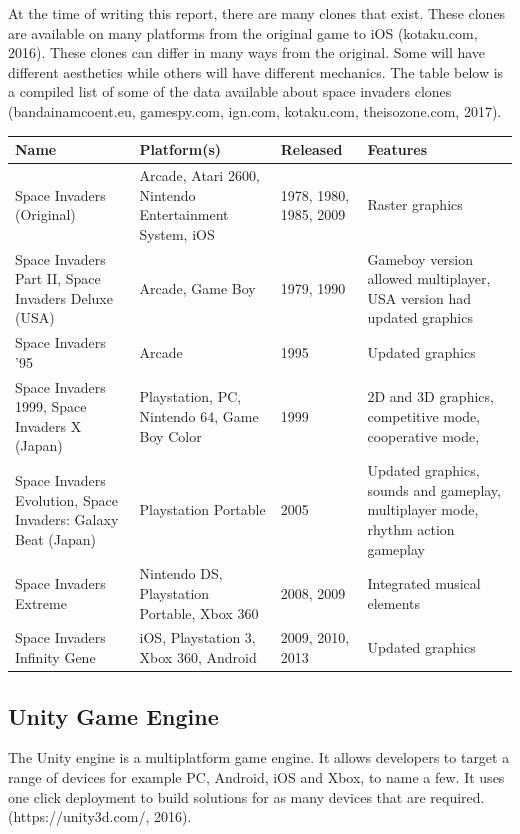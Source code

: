 \documentclass[12pt]{article}
\begin{document}
At the time of writing this report, there are many clones that exist. These clones are available on many platforms from the original game to iOS (kotaku.com, 2016). These clones can differ in many ways from the original. Some will have different aesthetics while others will have different mechanics. The table below is a compiled list of some of the data available about space invaders clones (bandainamcoent.eu, gamespy.com, ign.com, kotaku.com, theisozone.com, 2017).

\begin{center}
    \begin{tabular}{ | p{2.25cm} | p{2.5cm} | p{4.5cm} | p{4cm} |} \hline
    Name & Platform(s) & Released & Features \\ \hline
    Space Invaders (Original) & Arcade, Atari 2600, Nintendo Entertainment System, iOS & 1978, 1980, 1985, 2009 & Raster graphics \\ \hline
    
    Space Invaders Part II, Space Invaders Deluxe (USA) & Arcade, Game Boy & 1979, 1990 & Gameboy version allowed multiplayer, USA version had updated graphics\\ \hline
    
    Space Invaders '95 & Arcade & 1995 & Updated graphics  \\ \hline
    
	Space Invaders 1999, Space Invaders X (Japan) & Playstation, PC, Nintendo 64, Game Boy Color & 1999 & 2D and 3D graphics, competitive mode, cooperative mode,   \\ \hline 
	
	Space Invaders Evolution, Space Invaders: Galaxy Beat (Japan) & Playstation Portable & 2005 & Updated graphics, sounds and gameplay, multiplayer mode, rhythm action gameplay \\ \hline
	
	Space Invaders Extreme & Nintendo DS, Playstation Portable, Xbox 360 & 2008, 2009 & Integrated musical elements \\ \hline
	
	Space Invaders Infinity Gene & iOS, Playstation 3, Xbox 360, Android & 2009, 2010, 2013 & Updated graphics\\ \hline
    \end{tabular}
\end{center}

\newpage
\begin{center}
\subsection{Unity Game Engine}
\end{center}
The Unity engine is a multiplatform game engine. It allows developers to target a range of devices for example PC, Android, iOS and Xbox, to name a few. It uses one click deployment to build solutions for as many devices that are required. (https://unity3d.com/, 2016).
\end{document}
